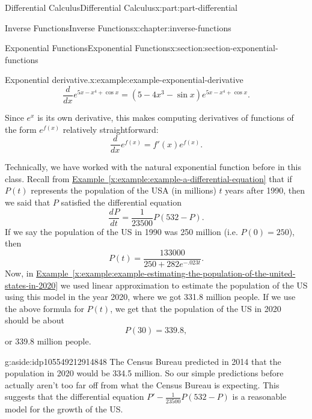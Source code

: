 \documentclass[twoside,10pt,]{book}
\newcommand{\xreffont}{\relax}
\numberwithin{equation}{part}
\newcommand{\dv}[3][]{\dfrac{d^{#1} #2}{d #3^{#1}}}
\begin{document}
\begin{partptx}{Differential Calculus}{}{Differential Calculus}{}{}{x:part:part-differential}
\begin{chapterptx}{Inverse Functions}{}{Inverse Functions}{}{}{x:chapter:inverse-functions}
\begin{sectionptx}{Exponential Functions}{}{Exponential Functions}{}{}{x:section:section-exponential-functions}
\begin{example}{Exponential derivative.}{x:example:example-exponential-derivative}
\begin{equation*}
\dv{}{x}e^{5x - x^{4} + \cos x} = (5 - 4x^{3} - \sin x)e^{5x - x^{4} + \cos x}.
\end{equation*}
%
\end{example}
Since \(e^{x}\) is its own derivative, this makes computing derivatives of functions of the form \(e^{f(x)}\) relatively straightforward:%
\begin{equation*}
\dv{}{x}e^{f(x)} = f'(x)e^{f(x)}.
\end{equation*}
%
\par
Technically, we have worked with the natural exponential function before in this class. Recall from \hyperref[x:example:example-a-differential-equation]{Example~{\xreffont\ref{x:example:example-a-differential-equation}}} that if \(P(t)\) represents the population of the USA (in millions) \(t\) years after 1990, then we said that \(P\) satisfied the differential equation%
\begin{equation*}
\dv{P}{t} = \frac{1}{23500}P(532 - P).
\end{equation*}
If we say the population of the US in 1990 was 250 million (i.e. \(P(0) = 250\)), then%
\begin{equation*}
P(t) = \frac{133000}{250 + 282e^{-.023t}}.
\end{equation*}
Now, in \hyperref[x:example:example-estimating-the-population-of-the-united-states-in-2020]{Example~{\xreffont\ref{x:example:example-estimating-the-population-of-the-united-states-in-2020}}} we used linear approximation to estimate the population of the US using this model in the year 2020, where we got 331.8 million people. If we use the above formula for \(P(t)\), we get that the population of the US in 2020 should be about%
\begin{equation*}
P(30) = 339.8,
\end{equation*}
or 339.8 million people.%
\begin{aside}{}{g:aside:idp105549212914848}%
The Census Bureau predicted in 2014 that the population in 2020 would be 334.5 million. So our simple predictions before actually aren't too far off from what the Census Bureau is expecting. This suggests that the differential equation \(P' - \frac{1}{23500}P(532-P)\) is a reasonable model for the growth of the US.%
\end{aside}
\end{sectionptx}
%
%
\typeout{************************************************}
\typeout{************************************************}

\end{chapterptx}
\end{partptx}
\end{document}
